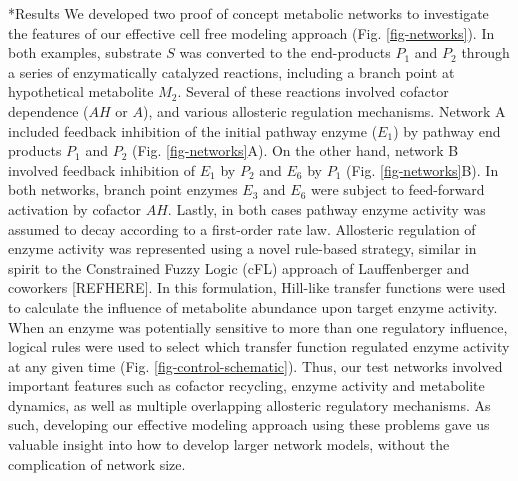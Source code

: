 \documentclass[12pt]{article}
\makeatletter
\renewcommand\section{\@startsection
	{subsection}{2}{0mm}
	{-0.2in}
	{0.05\baselineskip}
	{\normalfont\large\bfseries}}
\makeatother
\begin{document}
\section*{Results}
We developed two proof of concept metabolic networks to investigate the features of our effective cell free modeling approach (Fig. \ref{fig-networks}).
In both examples, substrate $S$ was converted to the end-products $P_{1}$ and $P_{2}$ through a series of enzymatically catalyzed reactions, 
including a branch point at hypothetical metabolite $M_{2}$. 
Several of these reactions involved cofactor dependence ($AH$ or $A$), and various allosteric regulation mechanisms. 
Network A included feedback inhibition of the initial pathway enzyme ($E_{1}$) by pathway end products $P_{1}$ and $P_{2}$ (Fig. \ref{fig-networks}A).
On the other hand, network B involved feedback inhibition of $E_{1}$ by $P_{2}$ and $E_{6}$ by $P_{1}$ (Fig. \ref{fig-networks}B). 
In both networks, branch point enzymes $E_{3}$ and $E_{6}$ were subject to feed-forward activation by cofactor $AH$.
Lastly, in both cases pathway enzyme activity was assumed to decay according to a first-order rate law. 
Allosteric regulation of enzyme activity was represented using a novel rule-based strategy, similar in spirit to the 
Constrained Fuzzy Logic (cFL) approach of Lauffenberger and coworkers [REFHERE]. 
In this formulation, Hill-like transfer functions were used to calculate the influence of metabolite abundance upon target enzyme activity. 
When an enzyme was potentially sensitive to more than one regulatory influence, logical rules were used to select which transfer function regulated enzyme 
activity at any given time (Fig. \ref{fig-control-schematic}).      
Thus, our test networks involved important features such as cofactor recycling, enzyme activity and metabolite dynamics, 
as well as multiple overlapping allosteric regulatory mechanisms.  
As such, developing our effective modeling approach using these problems gave us valuable insight into how to develop larger network models, 
without the complication of network size. 
\end{document}
